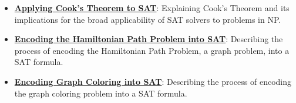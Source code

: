 \documentclass{article}%
\begin{document}
\begin{itemize}[leftmargin=*]
\item \href{https://purdue.brightspace.com/d2l/common/assets/pdfjs-d2l-dist/1.0.14-legacy/web/viewer.html?file=%2Fcontent%2Fenforced%2F1095467-wl.202510.CS.24300.001%2F15L2-SAT.pdf%3Fou%3D1095467&lang=en-us&container=d2l-fileviewer-rendered-pdf&fullscreen=d2l-fileviewer-rendered-pdf-dialog&height=667#page=54}{\textbf{Applying Cook's Theorem to SAT}}: Explaining Cook's Theorem and its implications for the broad applicability of SAT solvers to problems in NP.%
\item \href{https://purdue.brightspace.com/d2l/common/assets/pdfjs-d2l-dist/1.0.14-legacy/web/viewer.html?file=%2Fcontent%2Fenforced%2F1095467-wl.202510.CS.24300.001%2F15L2-SAT.pdf%3Fou%3D1095467&lang=en-us&container=d2l-fileviewer-rendered-pdf&fullscreen=d2l-fileviewer-rendered-pdf-dialog&height=667#page=40}{\textbf{Encoding the Hamiltonian Path Problem into SAT}}: Describing the process of encoding the Hamiltonian Path Problem, a graph problem, into a SAT formula.%
\item \href{https://purdue.brightspace.com/d2l/common/assets/pdfjs-d2l-dist/1.0.14-legacy/web/viewer.html?file=%2Fcontent%2Fenforced%2F1095467-wl.202510.CS.24300.001%2F15L2-SAT.pdf%3Fou%3D1095467&lang=en-us&container=d2l-fileviewer-rendered-pdf&fullscreen=d2l-fileviewer-rendered-pdf-dialog&height=667#page=47}{\textbf{Encoding Graph Coloring into SAT}}: Describing the process of encoding the graph coloring problem into a SAT formula.%
\end{itemize}

%
\end{document}
